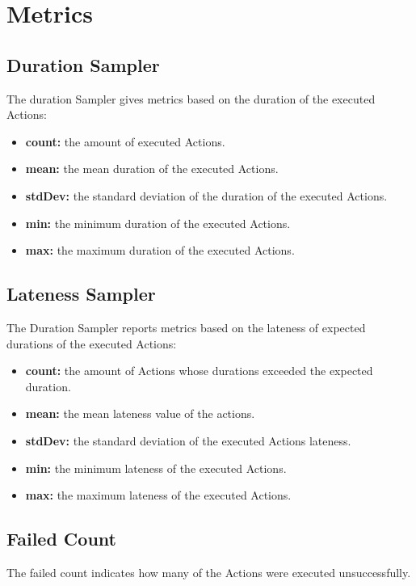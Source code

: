 \section{Metrics}
\subsection{Duration Sampler}
The duration Sampler gives metrics based on the duration of the executed Actions:
\begin{itemize}
	\item \textbf{count:} the amount of executed Actions.
	\item \textbf{mean:} the mean duration of the executed Actions.
	\item \textbf{stdDev:} the standard deviation of the duration of the executed Actions.
	\item \textbf{min:} the minimum duration of the executed Actions.
	\item \textbf{max:} the maximum duration of the executed Actions.
\end{itemize}
\subsection{Lateness Sampler}
The Duration Sampler reports metrics based on the lateness of expected durations of the executed Actions:
\begin{itemize}
	\item \textbf{count:} the amount of Actions whose durations exceeded the expected duration.
	\item \textbf{mean:} the mean lateness value of the actions.
	\item \textbf{stdDev:} the standard deviation of the executed Actions lateness.
	\item \textbf{min:} the minimum lateness of the executed Actions.
	\item \textbf{max:} the maximum lateness of the executed Actions.
\end{itemize}

\subsection{Failed Count}
The failed count indicates how many of the Actions were executed unsuccessfully.



